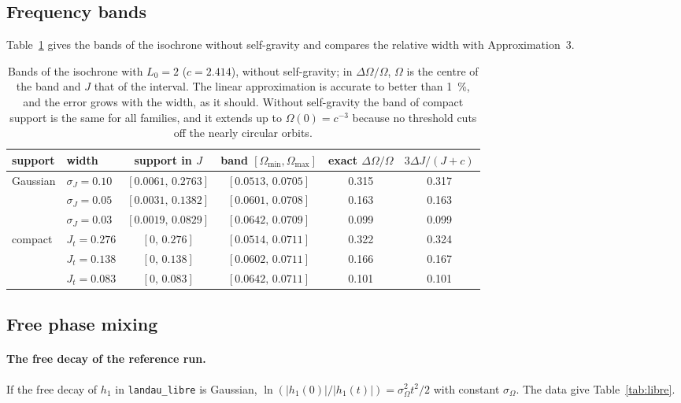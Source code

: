 \documentclass[11pt,a4paper]{article}
\begin{document}
\subsection{Frequency bands}
\label{sec:res_bandas}

Table~\ref{tab:bandas} gives the bands of the isochrone without self-gravity and
compares the relative width with Approximation~3.

\begin{table}[!htbp]
\centering
\small
\begin{tabular}{llcccc}
\toprule
support & width & support in $J$ & band $[\Omega_{\min},\Omega_{\max}]$ &
  exact $\Delta\Omega/\Omega$ & $3\Delta J/(J+c)$\\
\midrule
Gaussian & $\sigma_J=0.10$ & $[0.0061,\,0.2763]$ & $[0.0513,\,0.0705]$ & 0.315 & 0.317\\
          & $\sigma_J=0.05$ & $[0.0031,\,0.1382]$ & $[0.0601,\,0.0708]$ & 0.163 & 0.163\\
          & $\sigma_J=0.03$ & $[0.0019,\,0.0829]$ & $[0.0642,\,0.0709]$ & 0.099 & 0.099\\
\midrule
compact  & $J_t=0.276$ & $[0,\,0.276]$ & $[0.0514,\,0.0711]$ & 0.322 & 0.324\\
          & $J_t=0.138$ & $[0,\,0.138]$ & $[0.0602,\,0.0711]$ & 0.166 & 0.167\\
          & $J_t=0.083$ & $[0,\,0.083]$ & $[0.0642,\,0.0711]$ & 0.101 & 0.101\\
\bottomrule
\end{tabular}
\caption{Bands of the isochrone with $L_0=2$ ($c=2.414$), without self-gravity; in
$\Delta\Omega/\Omega$, $\Omega$ is the centre of the band and $J$ that of the interval. The linear
approximation is accurate to better than \SI{1}{\%}, and the error grows with the width, as
it should. Without self-gravity the band of compact support is the same for all
families, and it extends up to $\Omega(0)=c^{-3}$ because no threshold cuts off the nearly
circular orbits.}
\label{tab:bandas}
\end{table}

\subsection{Free phase mixing}
\label{sec:res_libre}
\label{sec:res_colas}
\label{sec:colasvalores}

\paragraph{The free decay of the reference run.} If the free decay of $h_1$ in
\texttt{landau\_\allowbreak libre} is Gaussian, $\ln(|h_1(0)|/|h_1(t)|)=\sigma_\Omega^2t^2/2$ with constant
$\sigma_\Omega$. The data give Table~\ref{tab:libre}.
\end{document}
